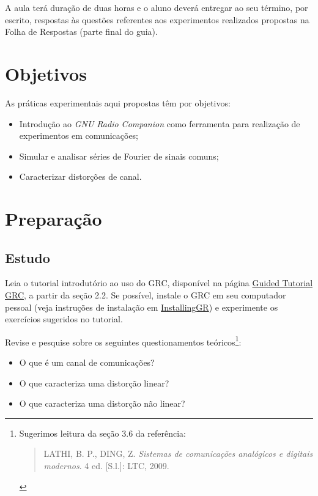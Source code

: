 \documentclass[12pt,addpoints]{exam}
\begin{document}
A aula terá duração de duas horas e o aluno deverá entregar ao seu término, por escrito, respostas às questões referentes aos experimentos realizados propostas na Folha de Respostas (parte final do guia).

\section{Objetivos}

As práticas experimentais aqui propostas têm por objetivos:
\begin{itemize}
    \item Introdução ao \textit{GNU Radio Companion} como ferramenta para realização de experimentos em comunicações;
    \item Simular e analisar séries de Fourier de sinais comuns;
    \item Caracterizar distorções de canal.
\end{itemize}

\newpage

\section{Preparação} \label{sect:Preparacao}

\subsection{Estudo}

Leia o tutorial introdutório ao uso do GRC, disponível na página \href{http://wiki.gnuradio.org/index.php/Guided_Tutorial_GRC}{Guided Tutorial GRC}, a partir da seção 2.2. Se possível, instale o GRC em seu computador pessoal (veja instruções de instalação em \href{http://wiki.gnuradio.org/index.php/InstallingGR}{InstallingGR}) e experimente os exercícios sugeridos no tutorial.

Revise e pesquise sobre os seguintes questionamentos teóricos\footnote{Sugerimos leitura da seção 3.6 da referência: \begin{quote} LATHI, B. P., DING, Z. \textit{Sistemas de comunicações analógicos e digitais modernos}. 4 ed. [S.l.]: LTC, 2009. \end{quote}}:
\begin{itemize}
    \item O que é um canal de comunicações?
    \item O que caracteriza uma distorção linear? 
    \item O que caracteriza uma distorção não linear?
\end{itemize}
\end{document}
